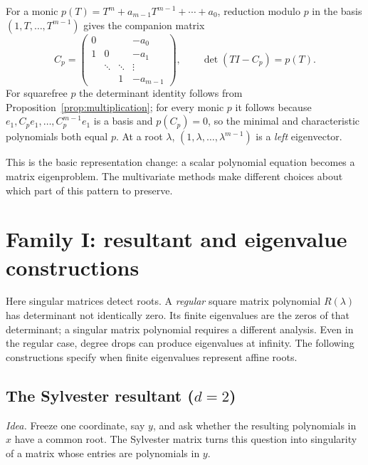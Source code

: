 \documentclass[12pt]{article}
\theoremstyle{definition}
\theoremstyle{remark}
\begin{document}
For a monic $p(T)=T^m+a_{m-1}T^{m-1}+\cdots+a_0$, reduction modulo $p$ in the
basis $(1,T,\ldots,T^{m-1})$ gives the companion matrix
\begin{equation}\label{eq:companion}
  C_p=\begin{pmatrix}
  0&&&-a_0\\
  1&0&&-a_1\\
  &\ddots&\ddots&\vdots\\
  &&1&-a_{m-1}
  \end{pmatrix},\qquad \det(TI-C_p)=p(T).
\end{equation}
For squarefree $p$ the determinant identity follows from
Proposition~\ref{prop:multiplication}; for every monic $p$ it follows because
$e_1,C_pe_1,\ldots,C_p^{m-1}e_1$ is a basis and $p(C_p)=0$, so the minimal
and characteristic polynomials both equal $p$. At a root $\lambda$,
$(1,\lambda,\ldots,\lambda^{m-1})$ is a \emph{left} eigenvector.

This is the basic representation change: a scalar polynomial equation becomes a
matrix eigenproblem. The multivariate methods make different choices about which
part of this pattern to preserve.

\section{Family I: resultant and eigenvalue constructions}\label{sec:familyI}

Here singular matrices detect roots. A \emph{regular} square matrix polynomial
$R(\lambda)$ has determinant not identically zero. Its finite eigenvalues are the
zeros of that determinant; a singular matrix polynomial requires a different analysis.
Even in the regular case, degree drops can produce eigenvalues at infinity. The
following constructions specify when finite eigenvalues represent affine roots.
\subsection{The Sylvester resultant (\texorpdfstring{$d=2$}{d=2})}\label{sec:sylvester}

\emph{Idea.} Freeze one coordinate, say $y$, and ask whether the resulting
polynomials in $x$ have a common root. The Sylvester matrix turns this question
into singularity of a matrix whose entries are polynomials in $y$.
\end{document}
